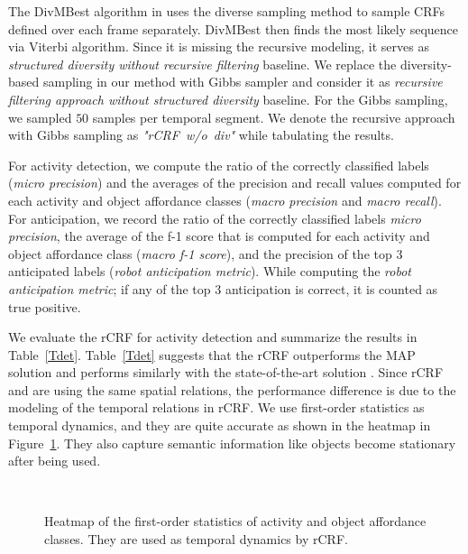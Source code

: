 The DivMBest algorithm in \cite{divmbest} uses the diverse sampling method to sample CRFs defined over each frame separately. DivMBest\cite{divmbest} then finds the most likely sequence via Viterbi algorithm. Since it is missing the recursive modeling, it serves as \emph{structured diversity without recursive filtering} baseline. We replace the diversity-based sampling in our method with Gibbs sampler and consider it as \emph{recursive filtering approach without structured diversity} baseline. For the Gibbs sampling, we sampled $50$ samples per temporal segment. We denote the recursive approach with Gibbs sampling as \emph{\mbox{"rCRF w/o div"}} while tabulating the results.

 For activity detection, we compute the ratio of the correctly classified labels (\emph{micro precision}) and the averages of the precision and recall values computed for each activity and object affordance classes (\emph{macro precision} and \emph{macro recall}). For anticipation, we record the ratio of the correctly classified labels \emph{micro precision}, the average of the f-1 score that is computed for each activity and object affordance class (\emph{macro f-1 score}), and the precision of the top 3 anticipated labels (\emph{robot anticipation metric}). While computing the \emph{robot anticipation metric}; if any of the top 3 anticipation is correct, it is counted as true positive.

We evaluate the rCRF for activity detection and summarize the results in Table~\ref{Tdet}. Table~\ref{Tdet} suggests that the rCRF outperforms the MAP solution \cite{hemaIJRR} and performs similarly with the state-of-the-art solution \cite{latentIcra}. Since rCRF and \cite{hemaIJRR} are using the same spatial relations, the performance difference is due to the modeling of the temporal relations in rCRF. We use \mbox{first-order} statistics as temporal dynamics, and they are quite accurate as shown in the heatmap in Figure~\ref{heatmap}. They also capture semantic information like objects become stationary after being used.

\begin{figure}
\centering
  ~
  \caption{Heatmap of the first-order statistics of activity and object affordance classes. They are used as temporal dynamics by rCRF.}
  \label{heatmap}
\end{figure}

